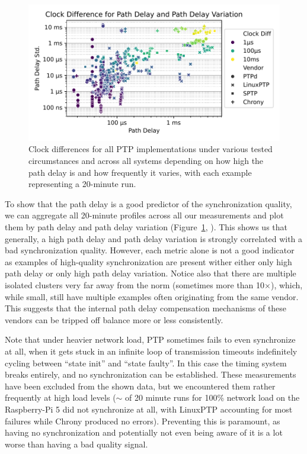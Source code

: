 \begin{figure}
    \includegraphics[width=\linewidth]{res/generated/base/clock_diff_by_path_delay.pdf}
    \caption{Clock differences for all PTP implementations under various tested circumstances and across all systems depending on how high the path delay is and how frequently it varies, with each example representing a 20-minute run.}
    \label{fig:path-delay-all}
\end{figure}

To show that the path delay is a good predictor of the synchronization quality, we can aggregate all 20-minute profiles across all our measurements and plot them by path delay and path delay variation (Figure~\ref{fig:path-delay-all}, ). This shows us that generally, a high path delay and path delay variation is strongly correlated with a bad synchronization quality. However, each metric alone is not a good indicator as examples of high-quality synchronization are present wither either only high path delay or only high path delay variation. Notice also that there are multiple isolated clusters very far away from the norm (sometimes more than 10$\times$), which, while small, still have multiple examples often originating from the same vendor. This suggests that the internal path delay compensation mechanisms of these vendors can be tripped off balance more or less consistently.

\newcommand{\loadFaultyNumFailures}{9}
\newcommand{\loadFaultyNumTrials}{34}
Note that under heavier network load, PTP sometimes fails to even synchronize at all, when it gets stuck in an infinite loop of transmission timeouts indefinitely cycling between ``state init'' and ``state faulty''. In this case the timing system breaks entirely, and no synchronization can be established. These measurements have been excluded from the shown data, but we encountered them rather frequently at high load levels ($\sim$\fPercentage{\loadFaultyNumFailures/\loadFaultyNumTrials} of 20 minute runs for 100\% network load on the Raspberry-Pi 5 did not synchronize at all, with LinuxPTP accounting for most failures while Chrony produced no errors). Preventing this is paramount, as having no synchronization and potentially not even being aware of it is a lot worse than having a bad quality signal.


